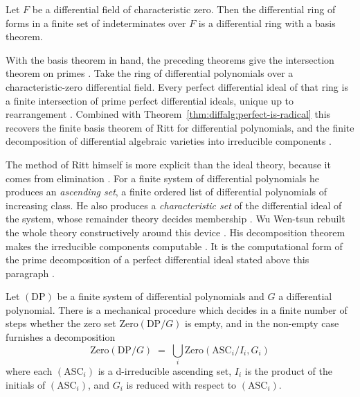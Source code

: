 \begin{theorem}\label{thm:diffalg:ritt-raudenbush-basis}
Let $F$ be a differential field of characteristic zero. Then the
differential ring of forms in a finite set of indeterminates over $F$ is
a differential ring with a basis theorem.
\end{theorem}

With the basis theorem in hand, the preceding theorems give the intersection
theorem on primes \cite[Theorems~5, 6 and~7, pp.~365--367]{Raudenbush1934}.
Take the ring of differential polynomials over
a characteristic-zero differential field. Every perfect differential ideal of
that ring is a finite intersection of prime
perfect differential ideals, unique up to rearrangement \cite[Theorems~5, 6
and~7, pp.~365--367]{Raudenbush1934}. Combined with
Theorem~\ref{thm:diffalg:perfect-is-radical} this recovers the finite basis
theorem of Ritt for differential polynomials, and the finite decomposition of
differential algebraic varieties into irreducible components
\cite[p.~361]{Raudenbush1934}.

The method of Ritt himself is more explicit than the ideal theory, because it
comes from elimination \cite[p.~176]{Wu1987RittConstructive}. For a finite
system of differential polynomials he produces an \emph{ascending set}, a
finite ordered list of differential polynomials of increasing class. He also
produces a \emph{characteristic set} of the differential ideal of the system,
whose remainder theory decides membership
\cite[p.~176]{Wu1987RittConstructive}. Wu Wen-tsun rebuilt the whole theory
constructively around this device \cite[pp.~175--184]{Wu1987RittConstructive}.
His decomposition theorem makes the irreducible components computable
\cite[p.~179]{Wu1987RittConstructive}. It is the computational form of the
prime decomposition of a perfect differential ideal stated above this
paragraph \cite[p.~179]{Wu1987RittConstructive}.

\begin{theorem}\label{thm:diffalg:wu-zero-decomposition}
Let $(\mathrm{DP})$ be a finite system of differential polynomials and
$G$ a differential polynomial. There is a mechanical procedure which
decides in a finite number of steps whether the zero set
$\mathrm{Zero}(\mathrm{DP}/G)$ is empty, and in the non-empty case
furnishes a decomposition
\[
\mathrm{Zero}(\mathrm{DP}/G) \;=\; \bigcup_i
\mathrm{Zero}(\mathrm{ASC}_i / I_i, G_i)
\]
where each $(\mathrm{ASC}_i)$ is a d-irreducible ascending set, $I_i$ is
the product of the initials of $(\mathrm{ASC}_i)$, and $G_i$ is reduced
with respect to $(\mathrm{ASC}_i)$.
\end{theorem}

